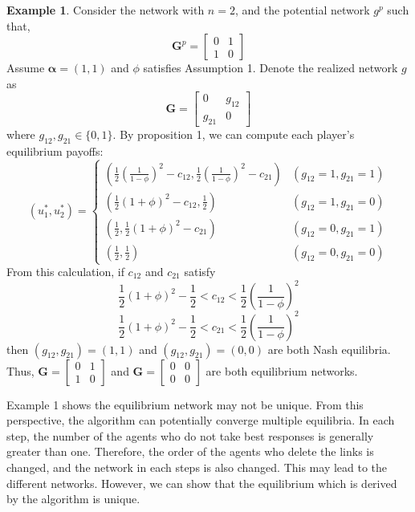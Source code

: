 \documentclass[12pt]{article}
\theoremstyle{definition}
\newtheorem{example}{Example}
\begin{document}
\begin{example}
Consider the network with $n=2$, and the potential network $g^p$ such that,
\[ \bm{G}^p = \left[
	\begin{array}{cc}
		0 & 1 \\
		1 & 0
	\end{array} \right] \]
Assume $\bm{\alpha} = (1, 1)$ and $\phi$ satisfies Assumption 1.
Denote the realized network $g$ as
\[ \bm{G} = \left[
	\begin{array}{cc}
		0 & g_{12} \\
		g_{21} & 0
	\end{array} \right] \]
where $g_{12}, g_{21} \in \{0,1\}$.
By proposition 1, we can compute each player's equilibrium payoffs:
\[ (u_1^*, u_2^*) =
	\begin{cases}
		\left( \frac{1}{2}{\left( \frac{1}{1 - \phi} \right)}^2 - c_{12}, \frac{1}{2}{\left( \frac{1}{1 - \phi} \right)}^2 - c_{21} \right) & (g_{12} = 1, g_{21} = 1) \\
		\left( \frac{1}{2}{(1+\phi)}^2 - c_{12}, \frac{1}{2} \right) & (g_{12} = 1, g_{21} = 0) \\
		\left( \frac{1}{2}, \frac{1}{2}{(1+\phi)}^2 - c_{21} \right) & (g_{12} = 0, g_{21} = 1) \\
		\left( \frac{1}{2}, \frac{1}{2} \right) & (g_{12} = 0, g_{21} = 0)
	\end{cases} \]
From this calculation, if $c_{12}$ and $c_{21}$ satisfy
\[ \frac{1}{2}{(1+\phi)}^2 - \frac{1}{2} < c_{12} < \frac{1}{2}{\left( \frac{1}{1 - \phi} \right)}^2 \]
\[ \frac{1}{2}{(1+\phi)}^2 - \frac{1}{2} < c_{21} < \frac{1}{2}{\left( \frac{1}{1 - \phi} \right)}^2 \]
then $(g_{12}, g_{21}) = (1,1)$ and $(g_{12}, g_{21}) = (0,0)$ are both Nash equilibria.
Thus, $\bm{G} = \left[
	\begin{array}{cc}
		0 & 1 \\
		1 & 0
	\end{array} \right]$
and $\bm{G} = \left[
	\begin{array}{cc}
		0 & 0 \\
		0 & 0
	\end{array} \right]$
are both equilibrium networks.
\end{example}

Example 1 shows the equilibrium network may not be unique.
From this perspective, the algorithm can potentially converge multiple equilibria.
In each step, the number of the agents who do not take best responses is generally greater than one.
Therefore, the order of the agents who delete the links is changed, and the network in each steps is also changed.
This may lead to the different networks.
However, we can show that the equilibrium which is derived by the algorithm is unique.
\end{document}
